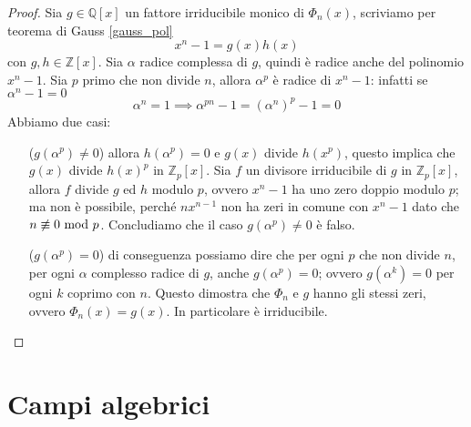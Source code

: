 \begin{proof}
	Sia $g\in\mathbb{Q}[x]$ un fattore irriducibile monico di $\Phi_n(x)$, scriviamo per teorema di Gauss \ref{gauss_pol}
	\begin{equation*}
	x^n-1=g(x)h(x)
	\end{equation*}
	con $g,h\in\mathbb{Z}[x]$. Sia $\alpha$ radice complessa di $g$, quindi è radice anche del polinomio $x^n-1$. Sia $p$ primo che non divide $n$, allora $\alpha^p$ è radice di $x^n-1$: infatti se $\alpha^n-1 = 0$
	\begin{equation*}
	\alpha^n = 1\implies \alpha^{pn} - 1 = (\alpha^n)^p - 1 = 0
	\end{equation*}
	Abbiamo due casi:
	\begin{itemize} 
		\item[($g(\alpha^p)\neq0$)] allora $h(\alpha^p)=0$ e $g(x)$ divide $h(x^p)$, questo implica che $g(x)$ divide $h(x)^p$ in $\mathbb{Z}_p[x]$. Sia $f$ un divisore irriducibile di $g$ in $\mathbb{Z}_p[x]$, allora $f$ divide $g$ ed $h$ modulo $p$, ovvero $x^n-1$ ha uno zero doppio modulo $p$; ma non è possibile, perché $nx^{n-1}$ non ha zeri in comune con $x^n-1$ dato che $n\not\equiv0\ \mathrm{mod}\ p$. Concludiamo che il caso $g(\alpha^p)\neq0$ è falso.
		\item[($g(\alpha^p)=0$)] di conseguenza possiamo dire che per ogni $p$ che non divide $n$, per ogni $\alpha$ complesso radice di $g$, anche $g(\alpha^p)=0$; ovvero $g(\alpha^k)=0$ per ogni $k$ coprimo con $n$. Questo dimostra che $\Phi_n$ e $g$ hanno gli stessi zeri, ovvero $\Phi_n(x)=g(x)$. In particolare è irriducibile.
	\end{itemize}
\end{proof}




\section{Campi algebrici}
